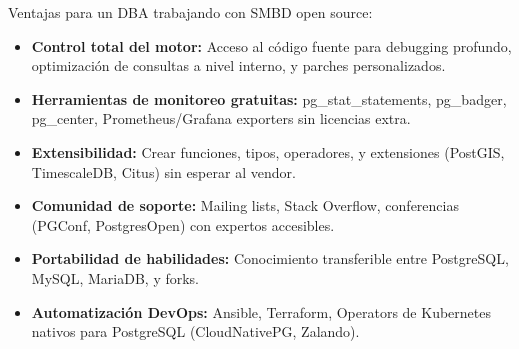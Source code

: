 \item
Ventajas para un DBA trabajando con SMBD open source:

\begin{itemize}
	\item \textbf{Control total del motor:} Acceso al código fuente para debugging profundo, optimización de consultas a nivel interno, y parches personalizados.
	\item \textbf{Herramientas de monitoreo gratuitas:} pg\_stat\_statements, pg\_badger, pg\_center, Prometheus/Grafana exporters sin licencias extra.
	\item \textbf{Extensibilidad:} Crear funciones, tipos, operadores, y extensiones (PostGIS, TimescaleDB, Citus) sin esperar al vendor.
	\item \textbf{Comunidad de soporte:} Mailing lists, Stack Overflow, conferencias (PGConf, PostgresOpen) con expertos accesibles.
	\item \textbf{Portabilidad de habilidades:} Conocimiento transferible entre PostgreSQL, MySQL, MariaDB, y forks.
	\item \textbf{Automatización DevOps:} Ansible, Terraform, Operators de Kubernetes nativos para PostgreSQL (CloudNativePG, Zalando).
\end{itemize}
